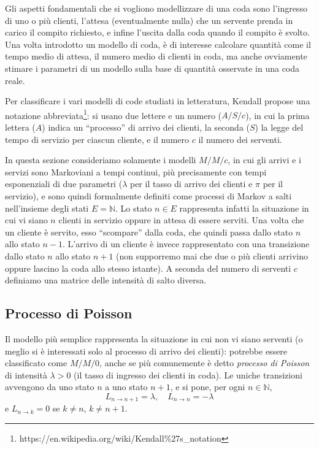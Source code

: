\documentclass[
  italian,
  letterpaper,
]{book}
\theoremstyle{definition}
\theoremstyle{remark}
\begin{document}
Gli aspetti fondamentali che si vogliono modellizzare di una coda sono
l'ingresso di uno o più clienti, l'attesa (eventualmente nulla) che un
servente prenda in carico il compito richiesto, e infine l'uscita dalla
coda quando il compito è svolto. Una volta introdotto un modello di
coda, è di interesse calcolare quantità come il tempo medio di attesa,
il numero medio di clienti in coda, ma anche ovviamente stimare i
parametri di un modello sulla base di quantità osservate in una coda
reale.

Per classificare i vari modelli di code studiati in letteratura, Kendall
propose una notazione abbreviata\footnote{https://en.wikipedia.org/wiki/Kendall\%27s\_notation}:
si usano due lettere e un numero (\(A/S/c\)), in cui la prima lettera
(\(A\)) indica un ``processo'' di arrivo dei clienti, la seconda (\(S\))
la legge del tempo di servizio per ciascun cliente, e il numero \(c\) il
numero dei serventi.

In questa sezione consideriamo solamente i modelli \(M/M/c\), in cui gli
arrivi e i servizi sono Markoviani a tempi continui, più precisamente
con tempi esponenziali di due parametri (\(\lambda\) per il tasso di
arrivo dei clienti e \(\pi\) per il servizio), e sono quindi formalmente
definiti come processi di Markov a salti nell'insieme degli stati
\(E = \mathbb{N}\). Lo stato \(n \in E\) rappresenta infatti la
situazione in cui vi siano \(n\) clienti in servizio oppure in attesa di
essere serviti. Una volta che un cliente è servito, esso ``scompare''
dalla coda, che quindi passa dallo stato \(n\) allo stato \(n-1\).
L'arrivo di un cliente è invece rappresentato con una transizione dallo
stato \(n\) allo stato \(n+1\) (non supporremo mai che due o più clienti
arrivino oppure lascino la coda allo stesso istante). A seconda del
numero di serventi \(c\) definiamo una matrice delle intensità di salto
diversa.

\subsection{Processo di Poisson}\label{processo-di-poisson}

Il modello più semplice rappresenta la situazione in cui non vi siano
serventi (o meglio si è interessati solo al processo di arrivo dei
clienti): potrebbe essere classificato come \(M/M/0\), anche se più
comunemente è detto \emph{processo di Poisson} di intensità
\(\lambda>0\) (il tasso di ingresso dei clienti in coda). Le uniche
transizioni avvengono da uno stato \(n\) a uno stato \(n+1\), e si pone,
per ogni \(n \in \mathbb{N}\),
\[ L_{n \to n+1} = \lambda, \quad L_{n \to n} = - \lambda\] e
\(L_{n \to k} = 0\) se \(k \neq n\), \(k \neq n+1\).
\end{document}
